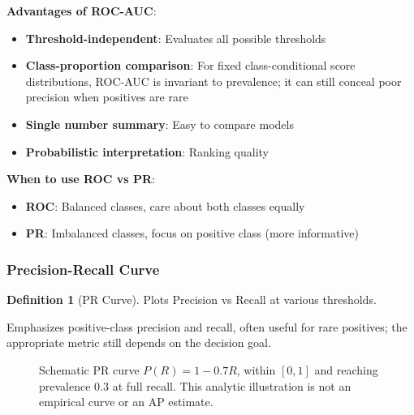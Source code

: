 \documentclass[11pt,twoside]{article}
\numberwithin{equation}{section}
\theoremstyle{plain}
\theoremstyle{definition}
\newtheorem{definition}[theorem]{Definition}
\theoremstyle{remark}
\newenvironment{keyidea}{
  \begin{tcolorbox}[colback=yellow!5!white,
                    colframe=yellow!50!black,
                    title=Key Idea,
                    breakable,
                    enhanced,
                    sharp corners,
                    boxrule=0.8pt,
                    left=6pt, right=6pt, top=6pt, bottom=6pt]
}{
  \end{tcolorbox}
}
\begin{document}
\begin{keyidea}
\textbf{Advantages of ROC-AUC}:
\begin{itemize}
\item \textbf{Threshold-independent}: Evaluates all possible thresholds
\item \textbf{Class-proportion comparison}: For fixed class-conditional score distributions, ROC-AUC is invariant to prevalence; it can still conceal poor precision when positives are rare
\item \textbf{Single number summary}: Easy to compare models
\item \textbf{Probabilistic interpretation}: Ranking quality
\end{itemize}

\textbf{When to use ROC vs PR}:
\begin{itemize}
\item \textbf{ROC}: Balanced classes, care about both classes equally
\item \textbf{PR}: Imbalanced classes, focus on positive class (more informative)
\end{itemize}
\end{keyidea}

\subsubsection{Precision-Recall Curve}

\begin{definition}[PR Curve]
Plots Precision vs Recall at various thresholds.

Emphasizes positive-class precision and recall, often useful for rare positives; the appropriate metric still depends on the decision goal.
\end{definition}

\begin{figure}[H]
\centering
{}
\caption{Schematic PR curve $P(R)=1-0.7R$, within $[0,1]$ and reaching prevalence $0.3$ at full recall. This analytic illustration is not an empirical curve or an AP estimate.}
\end{figure}
\end{document}
